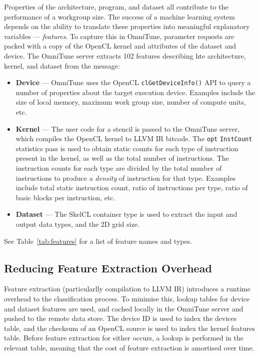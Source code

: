 Properties of the architecture, program, and dataset all contribute to
the performance of a workgroup size. The success of a machine learning
system depends on the ability to translate these properties into
meaningful explanatory variables --- \emph{features}. To capture this
in OmniTune, parameter requests are packed with a copy of the OpenCL
kernel and attributes of the dataset and device. The OmniTune server
extracts 102 features describing hte architecture, kernel, and dataset
from the message:
%
\begin{itemize}
\item \textbf{Device} --- OmniTune uses the OpenCL
  \texttt{clGetDeviceInfo()} API to query a number of properties about
  the target execution device. Examples include the size of local
  memory, maximum work group size, number of compute units, etc.
\item \textbf{Kernel} --- The user code for a stencil is passed to the
  OmniTune server, which compiles the OpenCL kernel to LLVM IR
  bitcode. The \texttt{opt} \texttt{InstCount} statistics pass is used
  to obtain static counts for each type of instruction present in the
  kernel, as well as the total number of instructions. The instruction
  counts for each type are divided by the total number of instructions
  to produce a \emph{density} of instruction for that type. Examples
  include total static instruction count, ratio of instructions per
  type, ratio of basic blocks per instruction, etc.
\item \textbf{Dataset} --- The SkelCL container type is used to
  extract the input and output data types, and the 2D grid size.
\end{itemize}
%
See Table~\ref{tab:features} for a list of feature names and types.


\subsection{Reducing Feature Extraction Overhead}


Feature extraction (particularlly compilation to LLVM IR) introduces a
runtime overhead to the classification process. To minimise this,
lookup tables for device and dataset features are used, and cached
locally in the OmniTune server and pushed to the remote data
store. The device ID is used to index the devices table, and the
checksum of an OpenCL source is used to index the kernel features
table. Before feature extraction for either occurs, a lookup is
performed in the relevant table, meaning that the cost of feature
extraction is amortised over time.


